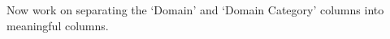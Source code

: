 \documentclass[
]{article}
\newenvironment{Shaded}{\begin{snugshade}}{\end{snugshade}}
\newcommand{\CommentTok}[1]{\textcolor[rgb]{0.56,0.35,0.01}{\textit{#1}}}
\newcommand{\DataTypeTok}[1]{\textcolor[rgb]{0.13,0.29,0.53}{#1}}
\newcommand{\KeywordTok}[1]{\textcolor[rgb]{0.13,0.29,0.53}{\textbf{#1}}}
\newcommand{\NormalTok}[1]{#1}
\newcommand{\OperatorTok}[1]{\textcolor[rgb]{0.81,0.36,0.00}{\textbf{#1}}}
\newcommand{\StringTok}[1]{\textcolor[rgb]{0.31,0.60,0.02}{#1}}
\begin{document}
Now work on separating the `Domain' and `Domain Category' columns into
meaningful columns.

\begin{Shaded}
\end{Shaded}
\end{document}
